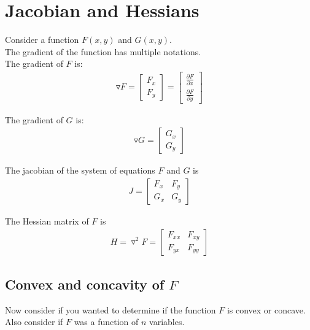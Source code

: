 \documentclass{article}
\begin{document}
\section{Jacobian and Hessians}

Consider a function $F(x,y)$ and $G(x,y)$. \\

The gradient of the function has multiple notations. \\

The gradient of $F$ is: 
\begin{align}
    \triangledown F = \begin{bmatrix}
        F_x \\
        F_y
    \end{bmatrix}
    = \begin{bmatrix}
        \frac{\partial F}{\partial x}\\
        \frac{\partial F}{\partial y}
    \end{bmatrix}
\end{align}

The gradient of $G$ is: 
\begin{align}
    \triangledown G = \begin{bmatrix}
        G_x \\
        G_y
    \end{bmatrix}
\end{align}

The jacobian of the system of equations $F$ and $G$ is 
\begin{align}
    J = \begin{bmatrix}
        F_x & F_y\\
        G_x & G_y 
    \end{bmatrix}
\end{align}

The Hessian matrix of $F$ is 
\begin{align}
    H = \triangledown^2 F = \begin{bmatrix}
        F_{xx} &  F_{xy} \\
        F_{yx} & F_{yy}
    \end{bmatrix}
\end{align}

\subsection{Convex and concavity of $F$}
Now consider if you wanted to determine if the function $F$ is convex or concave. Also consider if $F$ was a function of $n$ variables. \\
\end{document}
